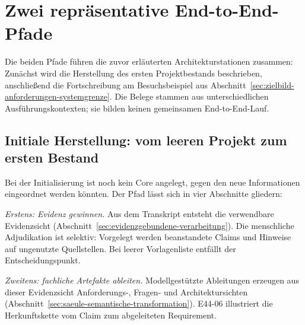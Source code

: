 
\section{Zwei repräsentative End-to-End-Pfade}
\label{sec:endtoend-pfade}

Die beiden Pfade führen die zuvor erläuterten Architekturstationen
zusammen: Zunächst wird die Herstellung des ersten Projektbestands
beschrieben, anschließend die Fortschreibung am Besuchsbeispiel aus
Abschnitt~\ref{sec:zielbild-anforderungen-systemgrenze}. Die Belege
stammen aus unterschiedlichen Ausführungskontexten; sie bilden
keinen gemeinsamen End-to-End-Lauf.

\subsection*{Initiale Herstellung: vom leeren Projekt zum ersten Bestand}

Bei der Initialisierung ist noch kein Core angelegt, gegen den
neue Informationen eingeordnet werden könnten. Der Pfad lässt sich
in vier Abschnitte gliedern:

\emph{Erstens: Evidenz gewinnen.} Aus dem Transkript entsteht die
verwendbare Evidenzsicht
(Abschnitt~\ref{sec:evidenzgebundene-verarbeitung}). Die menschliche
Adjudikation ist selektiv: Vorgelegt werden beanstandete Claims und
Hinweise auf ungenutzte Quellstellen. Bei leerer Vorlagenliste
entfällt der Entscheidungspunkt.

\emph{Zweitens: fachliche Artefakte ableiten.} Modellgestützte
Ableitungen erzeugen aus dieser Evidenzsicht Anforderungs-, Fragen-
und Architektursichten
(Abschnitt~\ref{sec:saeule-semantische-transformation}). E44-06
illustriert die Herkunftskette vom Claim zum abgeleiteten Requirement.

